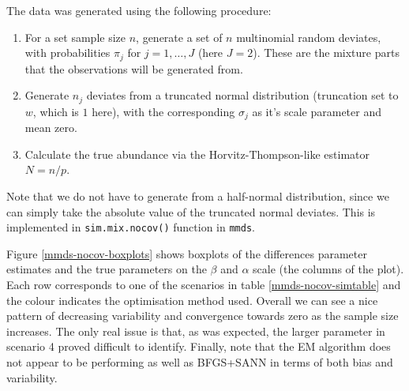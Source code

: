 The data was generated using the following procedure:
\begin{enumerate}
	\item For a set sample size $n$, generate a set of $n$ multinomial random deviates, with probabilities $\pi_j$ for $j=1,\ldots, J$ (here $J=2$). These are the mixture parts that the observations will be generated from.
	\item Generate $n_j$ deviates from a truncated normal distribution (truncation set to $w$, which is $1$ here), with the corresponding $\sigma_j$ as it's scale parameter and mean zero.
	\item Calculate the true abundance via the Horvitz-Thompson-like estimator $N=n/p$.
\end{enumerate}
Note that we do not have to generate from a half-normal distribution, since we can simply take the absolute value of the truncated normal deviates. This is implemented in \texttt{sim.mix.nocov()} function in \texttt{mmds}.

Figure \ref{mmds-nocov-boxplots} shows boxplots of the differences parameter estimates and the true parameters on the $\beta$ and $\alpha$ scale (the columns of the plot). Each row corresponds to one of the scenarios in table \ref{mmds-nocov-simtable} and the colour indicates the optimisation method used. Overall we can see a nice pattern of decreasing variability and convergence towards zero as the sample size increases. The only real issue is that, as was expected, the larger parameter in scenario 4 proved difficult to identify. Finally, note that the EM algorithm does not appear to be performing as well as BFGS+SANN in terms of both bias and variability.

